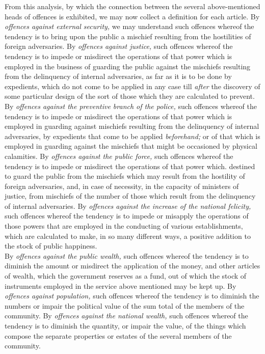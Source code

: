 \documentclass[12pt]{report}
\begin{document}
From this analysis, by which the connection between the several
above-mentioned heads of offences is exhibited, we may now collect a
definition for each article. By \emph{offences against external
security,} we may understand such offences whereof the tendency is to
bring upon the public a mischief resulting from the hostilities of
foreign adversaries. By \emph{offences against justice,} such offences
whereof the tendency is to impede or misdirect the operations of that
power which is employed in the business of guarding the public against
the mischiefs resulting from the delinquency of internal adversaries, as
far as it is to be done by expedients, which do not come to be applied
in any case till \emph{after} the discovery of some particular design of
the sort of those which they are calculated to prevent. By
\emph{offences against the preventive branch of the police,} such
offences whereof the tendency is to impede or misdirect the operations
of that power which is employed in guarding against mischiefs resulting
from the delinquency of internal adversaries, by expedients that come to
be applied \emph{beforehand;} or of that which is employed in guarding
against the mischiefs that might be occasioned by physical calamities.
By \emph{offences against the public force,} such offences whereof the
tendency is to impede or misdirect the operations of that power which.
destined to guard the public from the mischiefs which may result from
the hostility of foreign adversaries, and, in case of necessity, in the
capacity of ministers of justice, from mischiefs of the number of those
which result from the delinquency of internal adversaries. By
\emph{offences against the increase of the national felicity,} such
offences whereof the tendency is to impede or misapply the operations of
those powers that are employed in the conducting of various
establishments, which are calculated to make, in so many different ways,
a positive addition to the stock of public happiness.\\
By \emph{offences against the public wealth,} such offences whereof the
tendency is to diminish the amount or misdirect the application of the
money, and other articles of wealth, which the government reserves as a
fund, out of which the stock of instruments employed in the service
above mentioned may be kept up. By \emph{offences against population,}
such offences whereof the tendency is to diminish the numbers or impair
the political value of the sum total of the members of the community. By
\emph{offences against the national wealth,} such offences whereof the
tendency is to diminish the quantity, or impair the value, of the things
which compose the separate properties or estates of the several members
of the community.
\end{document}
